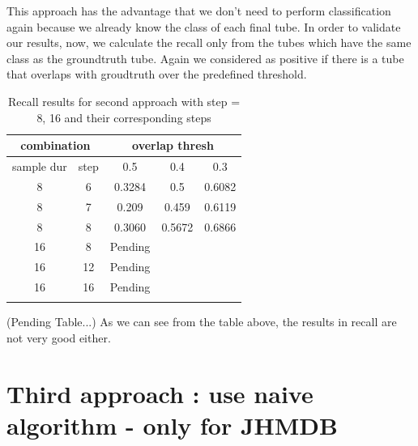 \documentclass{report}
\begin{document}
This approach has the advantage that we don't need to perform classification again because we already know the class of
each final tube. In order to validate our results, now, we calculate the recall only from the tubes which have the same
class as the groundtruth tube. Again we considered as positive if there is a tube that overlaps with groudtruth over the
predefined threshold. 

\begin{center}
\begin{longtable}{||c c||c c c||}
  \hline
  \multicolumn{2}{||c||}{\textbf{combination}} &\multicolumn{3}{|c||}{\textbf{overlap thresh}}\\

  \hline
  sample dur & step &   0.5  &  0.4 &  0.3 \\
  \hline   \hline
  8 & 6 & 0.3284 & 0.5 & 0.6082  \\
  \hline
  8 & 7 & 0.209	& 0.459 & 0.6119 \\
  \hline
  8 & 8 & 0.3060 & 0.5672 & 0.6866 \\
  \hline
  16 & 8  & Pending \\
  \hline
  16 & 12 & Pending \\
  \hline
  16 & 16 & Pending \\
  
  \hline     \hline                          

  \caption{Recall results for second approach with step = 8, 16 and their corresponding steps }
  \label{table:conn_app2}
\end{longtable} 
\end{center}



(Pending Table...)
As we can see from the table above, the results in recall are not very good either.
\section{Third approach : use naive algorithm - only for JHMDB}
\end{document}

